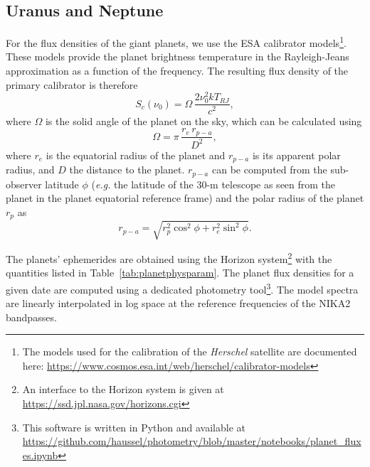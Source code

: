 \documentclass[traditionalabstract]{aa}
\begin{document}
{\begin{appendix}
\subsection{Uranus and Neptune}
\label{se:ref_flux_uranus_neptune}

For the flux densities of the giant planets, we use the ESA calibrator models\footnote{The models used for the calibration of the \emph{Herschel} satellite are documented here: \url{https://www.cosmos.esa.int/web/herschel/calibrator-models}}.
These models provide the planet brightness temperature in the
Rayleigh-Jeans approximation as a function of the frequency. The
resulting flux density of the primary calibrator is therefore 
\begin{equation}
S_c(\nu_0) = \Omega \, \frac{2 \nu_0^{2} k T_{RJ}}{c^2},
\end{equation}
where $\Omega$ is the solid angle of the planet on the sky, %
which can be calculated using
%
\begin{equation}
\Omega = \pi\, \frac{r_{e}\, r_{p-a}}{D^{2}}, 
\label{eq:omega}
\end{equation}
where $r_{e}$ is the equatorial radius of the planet and $r_{p-a}$ is
its apparent polar radius, and $D$ the distance to the
planet. $r_{p-a}$ can be computed from the sub-observer latitude $\phi$
({\it e.g.} the latitude of the 30-m telescope as seen from the planet in the
planet equatorial reference frame) and the polar radius of the
planet $r_{p}$ as
\begin{equation}
r_{p-a} = \sqrt{r_{p}^2 \cos^{2}\phi + r_{e}^2 \sin^{2} \phi}.
\end{equation}

The planets' ephemerides are obtained using the
Horizon system\footnote{An interface to the Horizon system is given at \url{https://ssd.jpl.nasa.gov/horizons.cgi}} with the quantities
listed in Table~\ref{tab:planetphysparam}. The planet flux densities for a given date are computed using a dedicated
photometry tool\footnote{This software is written in Python and available at \url{https://github.com/haussel/photometry/blob/master/notebooks/planet_fluxes.ipynb}}. The model spectra are linearly interpolated in log space at the
reference frequencies of the NIKA2 bandpasses. 


\end{appendix}}
\end{document}
